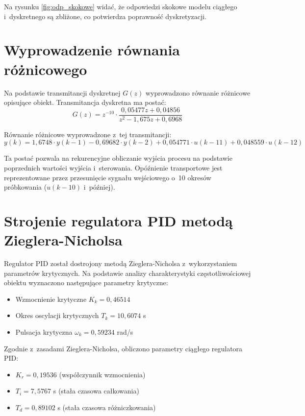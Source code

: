 \documentclass[a4paper,titlepage,11pt,floatssmall]{mwrep}
\begin{document}
Na rysunku \ref{fig:odp_skokowe} widać, że odpowiedzi skokowe modelu ciągłego i~dyskretnego są zbliżone, co potwierdza poprawność dyskretyzacji.

\section{Wyprowadzenie równania różnicowego}

Na podstawie transmitancji dyskretnej $G(z)$ wyprowadzono równanie różnicowe opisujące obiekt. Transmitancja dyskretna ma postać:
\begin{equation}
    G(z) = z^{-10} \cdot \frac{0,05477z + 0,04856}{z^2 - 1,675z + 0,6968}
\end{equation}

Równanie różnicowe wyprowadzone z~tej transmitancji:
\begin{equation}
    y(k) = 1,6748 \cdot y(k-1) - 0,69682 \cdot y(k-2) + 0,054771 \cdot u(k-11) + 0,048559 \cdot u(k-12)
\end{equation}

Ta postać pozwala na rekurencyjne obliczanie wyjścia procesu na podstawie poprzednich wartości wyjścia i~sterowania. Opóźnienie transportowe jest reprezentowane przez przesunięcie sygnału wejściowego o~10 okresów próbkowania ($u(k-10)$ i~później).

\section{Strojenie regulatora PID metodą Zieglera-Nicholsa}

Regulator PID został dostrojony metodą Zieglera-Nicholsa z~wykorzystaniem parametrów krytycznych. Na podstawie analizy charakterystyki częstotliwościowej obiektu wyznaczono następujące parametry krytyczne:
\begin{itemize}
    \item Wzmocnienie krytyczne $K_k = 0,46514$
    \item Okres oscylacji krytycznych $T_k = 10,6074$ s
    \item Pulsacja krytyczna $\omega_k = 0,59234$ rad/s
\end{itemize}

Zgodnie z~zasadami Zieglera-Nicholsa, obliczono parametry ciągłego regulatora PID:
\begin{itemize}
    \item $K_r = 0,19536$ (współczynnik wzmocnienia)
    \item $T_i = 7,5767$ s (stała czasowa całkowania)
    \item $T_d = 0,89102$ s (stała czasowa różniczkowania)
\end{itemize}
\end{document}
